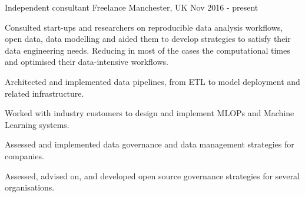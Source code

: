 \begin{cventries}
\cventry
{Independent consultant} %
{Freelance} %
{Manchester,  UK} %
{Nov 2016 - present } %
{ %
\begin{cvitems}
\item {Consulted start-ups and researchers on reproducible data analysis workflows, open data, data modelling and aided them to develop strategies to satisfy their data engineering needs. Reducing in most of the cases the computational times and optimised their data-intensive workflows.}
\item {Architected and implemented data pipelines, from ETL to model deployment and related infrastructure.}
\item{Worked with industry customers to design and implement MLOPs and Machine Learning systems.}
\item{Assessed and implemented data governance and data management strategies for companies.}
\item{Assessed, advised on, and developed open source governance strategies for several organisations.}
\end{cvitems}
}




\end{cventries}
